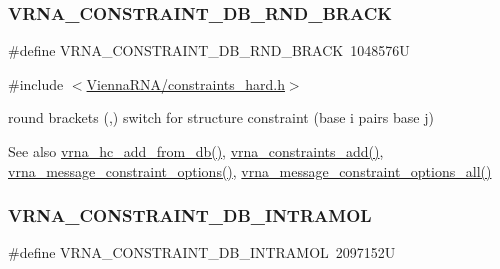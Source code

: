 \subsubsection{\texorpdfstring{V\+R\+N\+A\+\_\+\+C\+O\+N\+S\+T\+R\+A\+I\+N\+T\+\_\+\+D\+B\+\_\+\+R\+N\+D\+\_\+\+B\+R\+A\+CK}{VRNA\_CONSTRAINT\_DB\_RND\_BRACK}}
{\footnotesize\ttfamily \#define V\+R\+N\+A\+\_\+\+C\+O\+N\+S\+T\+R\+A\+I\+N\+T\+\_\+\+D\+B\+\_\+\+R\+N\+D\+\_\+\+B\+R\+A\+CK~1048576U}



{\ttfamily \#include $<$\mbox{\hyperlink{constraints__hard_8h}{Vienna\+R\+N\+A/constraints\+\_\+hard.\+h}}$>$}



round brackets \textquotesingle{}(\textquotesingle{},\textquotesingle{})\textquotesingle{} switch for structure constraint (base i pairs base j) 

\begin{DoxySeeAlso}{See also}
\mbox{\hyperlink{group__hard__constraints_ga5b4de3247b67358080c176b94591a8e6}{vrna\+\_\+hc\+\_\+add\+\_\+from\+\_\+db()}}, \mbox{\hyperlink{group__constraints_ga35a401f680969a556858a8dd5f1d07cc}{vrna\+\_\+constraints\+\_\+add()}}, \mbox{\hyperlink{group__constraints_gaa1f20b53bf09ac2e6b0dbb13f7d89670}{vrna\+\_\+message\+\_\+constraint\+\_\+options()}}, \mbox{\hyperlink{group__constraints_gaec7e13fa0465c2acc7a621d1aecb709f}{vrna\+\_\+message\+\_\+constraint\+\_\+options\+\_\+all()}} 
\end{DoxySeeAlso}
\mbox{\label{group__hard__constraints_ga5c17253f5a39d1d49b0fb11f5196982a}} 
\subsubsection{\texorpdfstring{V\+R\+N\+A\+\_\+\+C\+O\+N\+S\+T\+R\+A\+I\+N\+T\+\_\+\+D\+B\+\_\+\+I\+N\+T\+R\+A\+M\+OL}{VRNA\_CONSTRAINT\_DB\_INTRAMOL}}
{\footnotesize\ttfamily \#define V\+R\+N\+A\+\_\+\+C\+O\+N\+S\+T\+R\+A\+I\+N\+T\+\_\+\+D\+B\+\_\+\+I\+N\+T\+R\+A\+M\+OL~2097152U}



